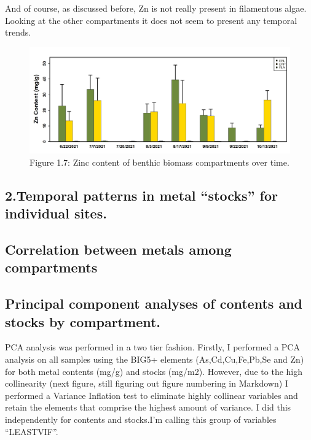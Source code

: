 \documentclass[
]{article}
\begin{document}
\FloatBarrier

And of course, as discussed before, Zn is not really present in
filamentous algae. Looking at the other compartments it does not seem to
present any temporal trends.

\begin{figure}
\includegraphics[width=1\linewidth]{Figures/7} \caption[Figure 1.7]{Figure 1.7: Zinc content of benthic biomass compartments over time.}\label{fig:unnamed-chunk-7}
\end{figure}

\FloatBarrier

\newpage

\hypertarget{temporal-patterns-in-metal-stocks-for-individual-sites.}{%
\subsection{2.Temporal patterns in metal ``stocks'' for individual
sites.}\label{temporal-patterns-in-metal-stocks-for-individual-sites.}}

\newpage

\hypertarget{correlation-between-metals-among-compartments}{%
\subsection{Correlation between metals among
compartments}\label{correlation-between-metals-among-compartments}}

\newpage

\hypertarget{principal-component-analyses-of-contents-and-stocks-by-compartment.}{%
\subsection{Principal component analyses of contents and stocks by
compartment.}\label{principal-component-analyses-of-contents-and-stocks-by-compartment.}}

PCA analysis was performed in a two tier fashion. Firstly, I performed a
PCA analysis on all samples using the BIG5+ elements (As,Cd,Cu,Fe,Pb,Se
and Zn) for both metal contents (mg/g) and stocks (mg/m2). However, due
to the high collinearity (next figure, still figuring out figure
numbering in Markdown) I performed a Variance Inflation test to
eliminate highly collinear variables and retain the elements that
comprise the highest amount of variance. I did this independently for
contents and stocks.I'm calling this group of variables ``LEASTVIF''.
\end{document}

